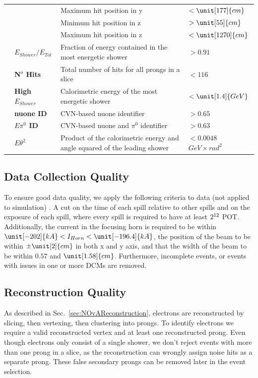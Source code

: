 \begin{table}[!hb]
\begin{tabular}{|m{2mm} m{} m{} m{}|}
& & Maximum hit position in y & $<\unit[177]{cm}$\\
& & Minimum hit position in z & $>\unit[55]{cm}$\\
& & Maximum hit position in z & $<\unit[1270]{cm}$\\\hline
\parbox[t]{2mm}{} &
\textbf{$E_{Shower}/E_{Tot}$} & Fraction of energy contained in the most energetic shower & $>0.91$\\
& \textbf{N$^o$ Hits} & Total number of hits for all prongs in a slice & $<116$\\
& \textbf{High $E_{Shower}$} & Calorimetric energy of the most energetic shower & $<\unit[1.4]{GeV}$\\
& \textbf{\gls{nuone} ID} & \gls{CVN}-based \gls{nuone} identifier & $>0.65$\\
& \textbf{$E\pi^0$ ID} & \gls{CVN}-based \gls{nuone} and $\pi^0$ identifier & $>0.63$\\
& \textbf{$E\theta^2$} & Product of the calorimetric energy and angle squared of the leading shower & $<0.0048$ $\unit{GeV\times rad^2}$\\\hline
\end{tabular}
\label{tab:EventSelectionSummary}
\end{table}

\subsection{Data Collection Quality}\label{sec:NuMMEventSelSpillCuts}
To ensure good data quality, we apply the following criteria to data (not applied to simulation) \cite{NOvA-doc-59876}. A cut on the time of each spill relative to other spills and on the exposure of each spill, where every spill is required to have at least $2\time10^{12}$ \gls{POT}. Additionally, the current in the focusing horn is required to be within $\unit[-202]{kA}<I_{Horn}<\unit[-196.4]{kA}$, the position of the beam to be within $\pm\unit[2]{cm}$ in both x and y axis, and that the width of the beam to be within $0.57$ and $\unit[1.58]{cm}$. Furthermore, incomplete events, or events with issues in one or more \glspl{DCM} are removed.

\subsection{Reconstruction Quality}\label{sec:NuMMEventSelRecoQC}
As described in Sec.~\ref{sec:NOvAReconstruction}, electrons are reconstructed by slicing, then vertexing, then clustering into prongs. To identify electrons we require a valid reconstructed vertex and at least one reconstructed prong. Even though electrons only consist of a single shower, we don't reject events with more than one prong in a slice, as the reconstruction can wrongly assign noise hits as a separate prong. These false secondary prongs can be removed later in the event selection.

